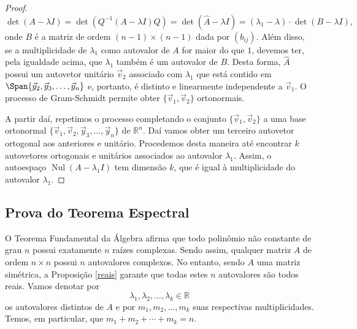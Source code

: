 \begin{proof}
	\begin{equation}
	\det \left( A - \lambda I \right) = \det \left( Q^{-1} (A - \lambda I) Q \right) =	\det \left( \hat{A} - \lambda I \right) = (\lambda_1 - \lambda) \cdot \det (B - \lambda I),
	\end{equation} onde $B$ é a matriz de ordem $(n-1)\times (n-1)$ dada por $(b_{ij})$. Além disso, se a multiplicidade de $\lambda_1$ como autovalor de $A$ for maior do que $1$, devemos ter, pela igualdade acima, que $\lambda_1$ também é um autovalor de $B$. Desta forma, $\hat{A}$ possui um autovetor unitário $\vec{v}_2$ associado com $\lambda_1$ que está contido em $\Span \{ \vec{y}_2, \vec{y}_3, \dots, \vec{y}_n \}$ e, portanto, é distinto e linearmente independente a $\vec{v}_1$. O processo de Gram-Schmidt permite obter $\{\vec{v}_1, \vec{v}_2\}$ ortonormais.

	A partir daí, repetimos o processo completando o conjunto $\{\vec{v}_1, \vec{v}_2\}$ a uma base ortonormal $\{ \vec{v}_1, \vec{v}_2, \vec{y}_3, \dots, \vec{y}_n \}$ de $\mathbb{R}^n$. Daí vamos obter um terceiro autovetor ortogonal aos anteriores e unitário. Procedemos desta maneira até encontrar $k$ autovetores ortogonais e unitários associados ao autovalor $\lambda_1$. Assim, o autoespaço $\operatorname{Nul} (A - \lambda_1 I)$ tem dimensão $k$, que é igual à multiplicidade do autovalor $\lambda_1$.
\end{proof}

\subsection{Prova do Teorema Espectral}

O Teorema Fundamental da Álgebra afirma que todo polinômio não constante de grau $n$ possui exatamente $n$ raízes complexas. Sendo assim, qualquer matriz $A$ de ordem $n\times n$ possui $n$ autovalores complexos. No entanto, sendo $A$ uma matriz simétrica, a Proposição \ref{reais} garante que todas estes $n$ autovalores são todos reais. Vamos denotar por
\begin{equation}
\lambda_1, \lambda_2, \dots, \lambda_k \in \mathbb{R}
\end{equation} os autovalores distintos de $A$ e por $m_1, m_2, \dots, m_k$ suas respectivas multiplicidades. Temos, em particular, que $m_1 + m_2 + \cdots + m_k = n$.

